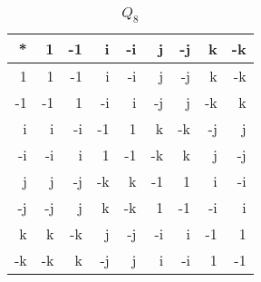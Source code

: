 \documentclass[12pt]{report}
\begin{document}
\begin{itemize}
\begin{table}[h]
  \centering
\caption{$Q_8$}
\label{Quaternion}
\begin{tabular}{r|rrrrrrrr}
*  &  1 & -1 &  i & -i &  j & -j &  k & -k    \\
\hline
1  &  1 & -1 &  i & -i &  j & -j &  k & -k \\
-1 & -1 &  1 & -i &  i & -j &  j & -k &  k \\
i  &  i & -i & -1 &  1 &  k & -k & -j &  j \\
-i & -i &  i &  1 & -1 & -k &  k &  j & -j \\
j  &  j & -j & -k &  k & -1 &  1 &  i & -i \\
-j & -j &  j &  k & -k &  1 & -1 & -i &  i \\
k  &  k & -k &  j & -j & -i &  i & -1 &  1 \\
-k & -k &  k & -j &  j &  i & -i &  1 & -1 \\
\end{tabular}
\end{table}
\end{itemize}
\end{document}
